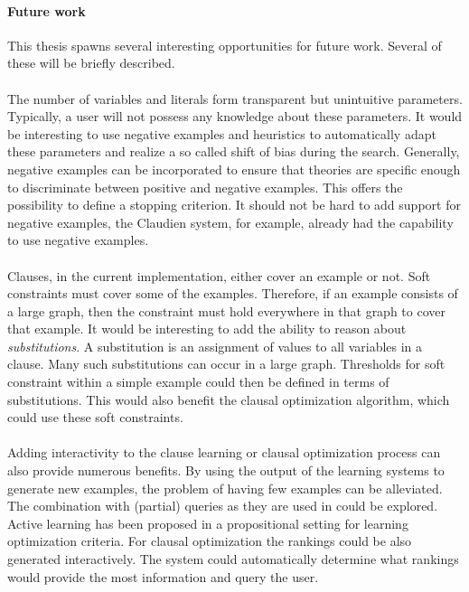 \paragraph{Future work}
This thesis spawns several interesting opportunities for future work.
Several of these will be briefly described.
\\\\
The number of variables and literals form transparent but unintuitive parameters.
Typically, a user will not possess any knowledge about these parameters.
It would be interesting to use negative examples and heuristics to automatically adapt these parameters and realize a so called shift of bias during the search.
Generally, negative examples can be incorporated to ensure that theories are specific enough to discriminate between positive and negative examples.
This offers the possibility to define a stopping criterion.
It should not be hard to add support for negative examples, the Claudien system, for example, already had the capability to use negative examples.
\\\\
Clauses, in the current implementation, either cover an example or not.
Soft constraints must cover some of the examples.
Therefore, if an example consists of a large graph, then the constraint must hold everywhere in that graph to cover that example.
It would be interesting to add the ability to reason about \emph{substitutions}.
A substitution is an assignment of values to all variables in a clause.
Many such substitutions can occur in a large graph.
Thresholds for soft constraint within a simple example could then be defined in terms of substitutions.
This would also benefit the clausal optimization algorithm, which could use these soft constraints.
\\\\
Adding interactivity to the clause learning or clausal optimization process can also provide numerous benefits.
By using the output of the learning systems to generate new examples, the problem of having few examples can be alleviated.
The combination with (partial) queries as they are used in \cite{bessiere2013constraint,bessiere2007query} could be explored.
Active learning has been proposed in a propositional setting \cite{campigotto2011active} for learning optimization criteria.
For clausal optimization the rankings could be also generated interactively.
The system could automatically determine what rankings would provide the most information and query the user.
\\\\
